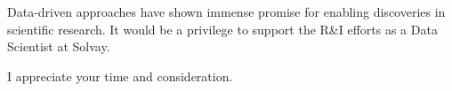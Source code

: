 \documentclass[11pt, a4paper]{awesome-cv}
\begin{document}
\begin{cvletter}
    Data-driven approaches have shown immense promise for enabling discoveries
    in scientific research.
    It would be a privilege to support the R\&I efforts as a
    Data Scientist at Solvay.

    I appreciate your time and consideration.

\end{cvletter}


\makeletterclosing
\end{document}
